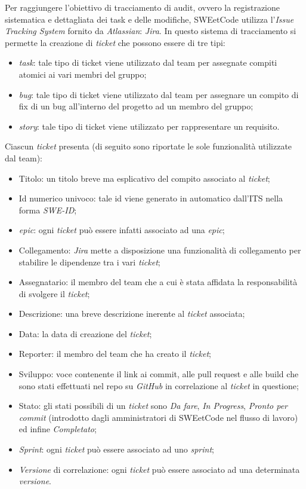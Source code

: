 \documentclass[10pt, a4paper]{article}
\begin{document}
Per raggiungere l'obiettivo di tracciamento di audit, ovvero la registrazione sistematica e dettagliata dei task e delle modifiche, SWEetCode utilizza 
l'\textit{Issue Tracking System\pg} fornito da \textit{Atlassian}: \textit{Jira}.
In questo sistema di tracciamento si permette la creazione di \textit{ticket} che possono essere di tre tipi:
\begin{itemize}
    \item \textit{task}: tale tipo di ticket viene utilizzato dal team per assegnate compiti atomici ai vari membri del gruppo;
    \item \textit{\textit{bug\pg}}: tale tipo di ticket viene utilizzato dal team per assegnare un compito di fix di un bug all'interno del progetto ad un membro del gruppo; 
    \item \textit{story}: tale tipo di ticket viene utilizzato per rappresentare un requisito.
\end{itemize}
Ciascun \textit{ticket} presenta (di seguito sono riportate le sole funzionalità utilizzate dal team):
\begin{itemize}
    \item Titolo: un titolo breve ma esplicativo del compito associato al \textit{ticket};
    \item Id numerico univoco: tale id viene generato in automatico dall'ITS nella forma \textit{SWE-ID};
    \item \textit{epic}: ogni \textit{ticket} può essere infatti associato ad una \textit{epic};
    \item Collegamento: \textit{Jira} mette a disposizione una funzionalità di collegamento per stabilire le dipendenze tra i vari \textit{ticket};
    \item Assegnatario: il membro del team che a cui è stata affidata la responsabilità di svolgere il \textit{ticket};
    \item Descrizione: una breve descrizione inerente al \textit{ticket} associata;
    \item Data: la data di creazione del \textit{ticket};
    \item Reporter: il membro del team che ha creato il \textit{ticket};
    \item Sviluppo: voce contenente il link ai commit, alle pull request e alle build che sono stati effettuati nel repo su \textit{GitHub} in correlazione al \textit{ticket} in questione;
    \item Stato: gli stati possibili di un \textit{ticket} sono \textit{Da fare}, \textit{In Progress}, \textit{Pronto per commit} (introdotto dagli amministratori di SWEetCode nel flusso di lavoro) ed infine \textit{Completato};
    \item \textit{Sprint\pg}: ogni \textit{ticket} può essere associato ad uno \textit{sprint};
    \item \textit{Versione} di correlazione: ogni \textit{ticket} può essere associato ad una determinata \textit{versione}.
\end{itemize}
\end{document}
